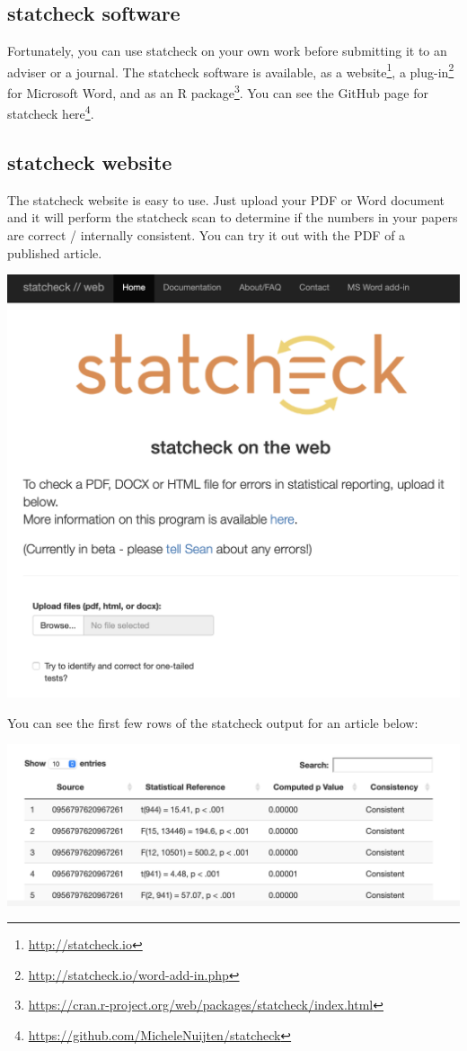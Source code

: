 \documentclass[
]{krantz}
\renewcommand{\href}[2]{#2\footnote{\url{#1}}}
\begin{document}
\hypertarget{statcheck-software}{%
\subsection{statcheck software}\label{statcheck-software}}

Fortunately, you can use statcheck on your own work before submitting it to an adviser or a journal. The statcheck software is available, as a \href{http://statcheck.io}{website}, a \href{http://statcheck.io/word-add-in.php}{plug-in} for Microsoft Word, and as an \href{https://cran.r-project.org/web/packages/statcheck/index.html}{R package}. You can see the GitHub page for statcheck \href{https://github.com/MicheleNuijten/statcheck}{here}.

\hypertarget{statcheck-website}{%
\subsection{statcheck website}\label{statcheck-website}}

The statcheck website is easy to use. Just upload your PDF or Word document and it will perform the statcheck scan to determine if the numbers in your papers are correct / internally consistent. You can try it out with the PDF of a published article.

\includegraphics[width=0.6\linewidth]{ch_tools/images/statcheck_website}

You can see the first few rows of the statcheck output for an article below:

\includegraphics[width=0.6\linewidth]{ch_tools/images/statcheck_output}
\end{document}
